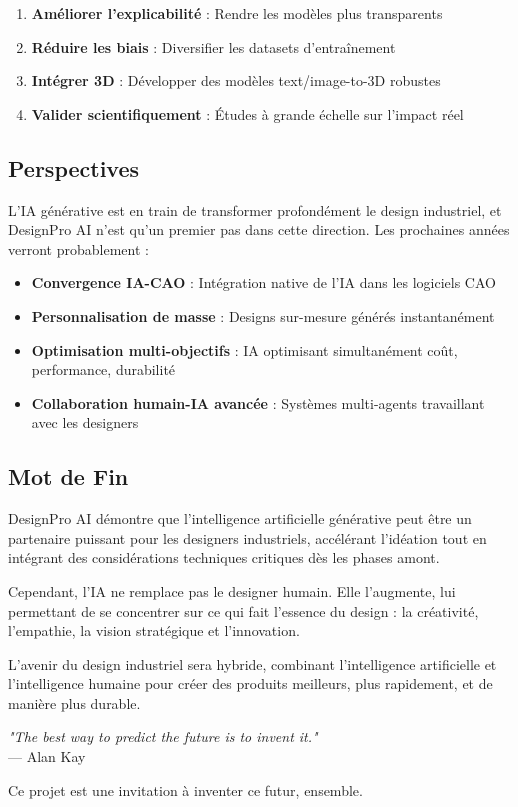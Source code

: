\begin{enumerate}[leftmargin=*]
    \item \textbf{Améliorer l'explicabilité} : Rendre les modèles plus transparents
    \item \textbf{Réduire les biais} : Diversifier les datasets d'entraînement
    \item \textbf{Intégrer 3D} : Développer des modèles text/image-to-3D robustes
    \item \textbf{Valider scientifiquement} : Études à grande échelle sur l'impact réel
\end{enumerate}

\subsection{Perspectives}

L'IA générative est en train de transformer profondément le design industriel, et DesignPro AI n'est qu'un premier pas dans cette direction. Les prochaines années verront probablement :

\begin{itemize}[leftmargin=*]
    \item \textbf{Convergence IA-CAO} : Intégration native de l'IA dans les logiciels CAO
    \item \textbf{Personnalisation de masse} : Designs sur-mesure générés instantanément
    \item \textbf{Optimisation multi-objectifs} : IA optimisant simultanément coût, performance, durabilité
    \item \textbf{Collaboration humain-IA avancée} : Systèmes multi-agents travaillant avec les designers
\end{itemize}

\subsection{Mot de Fin}

DesignPro AI démontre que l'intelligence artificielle générative peut être un partenaire puissant pour les designers industriels, accélérant l'idéation tout en intégrant des considérations techniques critiques dès les phases amont.

Cependant, l'IA ne remplace pas le designer humain. Elle l'augmente, lui permettant de se concentrer sur ce qui fait l'essence du design : la créativité, l'empathie, la vision stratégique et l'innovation.

L'avenir du design industriel sera hybride, combinant l'intelligence artificielle et l'intelligence humaine pour créer des produits meilleurs, plus rapidement, et de manière plus durable.

\vspace{1cm}

\begin{center}
\textit{"The best way to predict the future is to invent it."} \\
— Alan Kay
\end{center}

\vspace{1cm}

Ce projet est une invitation à inventer ce futur, ensemble.

